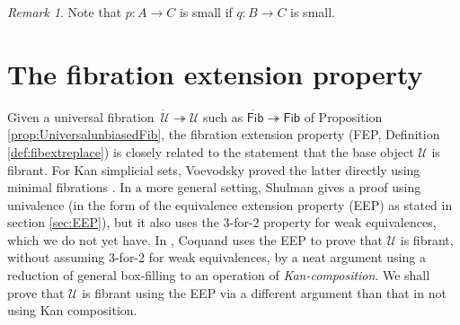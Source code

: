 \documentclass[12pt]{article}
\newcommand{\ednote}[1]{[\textit{\color{red}{#1}}]} %
\newcommand{\ra}{\ensuremath{\rightarrow}}
\newcommand{\fib}{\ensuremath{\twoheadrightarrow}}
\newcommand{\I}{\ensuremath{\mathrm{I}}}
\newcommand{\U}{\ensuremath{\mathcal{U}}}
\newcommand{\UU}{\ensuremath{\,\dot{\mathcal{U}}}}
\newcommand{\Fib}{\ensuremath{\mathsf{Fib}}}
\newcommand{\FFib}{\ensuremath{\dot{\mathsf{Fib}}}}
\theoremstyle{remark}
\newtheorem{remark}[theorem]{Remark}
\theoremstyle{definition}
\begin{document}
\begin{remark}
Note that $p : A \ra C$ is small if $q : B\ra C$ is small.
\end{remark}


\section{The fibration extension property}\label{sec:FEP}

Given a universal fibration $\UU\fib\U$ such as $\FFib\fib\Fib$ of Proposition \ref{prop:UniversalunbiasedFib}, the fibration extension property (FEP, Definition \ref{def:fibextreplace}) is closely related to the statement that the base object $\U$ is fibrant.  For Kan simplicial sets, Voevodsky proved the latter directly using minimal fibrations \cite{VVuniverse}.   In a more general setting, Shulman \cite{Shulmanuniverse} gives a proof using univalence (in the form of the equivalence extension property (EEP) as stated in section \ref{sec:EEP}), but it also uses the 3-for-2 property for weak equivalences, which we do not yet have. In \cite{CCHM}, Coquand uses the EEP to prove that $\U$ is fibrant, without assuming 3-for-2 for weak equivalences, by a neat argument using a reduction of general box-filling to an operation of \emph{Kan-composition}.   We shall prove that $\U$ is fibrant using the EEP via a different argument than that in \cite{CCHM} not using Kan composition.
\end{document}
